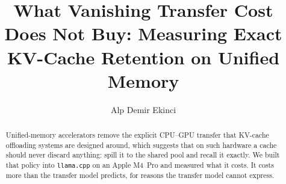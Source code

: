 \documentclass[manuscript,anonymous,review]{acmart}
\begin{document}
\title{What Vanishing Transfer Cost Does Not Buy: Measuring Exact
       KV-Cache Retention on Unified Memory}

\author{Alp Demir Ekinci}
\renewcommand{\shortauthors}{Ekinci}

\begin{abstract}
Unified-memory accelerators remove the explicit CPU--GPU transfer that
KV-cache offloading systems are designed around, which suggests that on
such hardware a cache should never discard anything: spill it to the
shared pool and recall it exactly. We built that policy into
\texttt{llama.cpp} on an Apple M4~Pro and measured what it costs. It
costs more than the transfer model predicts, for reasons the transfer
model cannot express.


\end{abstract}
\end{document}

